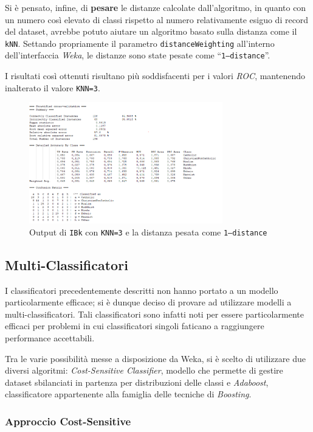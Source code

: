 \documentclass[a4paper,11pt,twoside,notitlepage,final]{scrartcl}
\begin{document}
Si è pensato, infine, di \textbf{pesare} le distanze calcolate dall'algoritmo, in quanto con un numero così elevato di classi rispetto al numero relativamente esiguo di record del dataset, avrebbe potuto aiutare un algoritmo basato sulla distanza come il \texttt{kNN}.
Settando propriamente il parametro \texttt{distanceWeighting} all'interno dell'interfaccia \emph{Weka}, le distanze sono state pesate come ``\texttt{1--distance}''.

I risultati così ottenuti risultano più soddisfacenti per i valori \emph{ROC}, mantenendo inalterato il valore \texttt{KNN=3}.

\begin{figure}[H]
  \centering
  \includegraphics[width=0.75\textwidth]{fig/kNNWeighted.PNG}%
  \caption{Output di \texttt{IBk} con \texttt{KNN=3} e la distanza pesata come \texttt{1--distance}}%
  \label{fig:ibk:9}
\end{figure}

\subsection{Multi-Classificatori}

I classificatori precedentemente descritti non hanno portato a un modello particolarmente efficace;
si è dunque deciso di provare ad utilizzare modelli a multi-classificatori.
Tali classificatori sono infatti noti per essere particolarmente efficaci per problemi in cui classificatori singoli faticano a raggiungere performance accettabili.

Tra le varie possibilità messe a disposizione da Weka, si è scelto di utilizzare due diversi algoritmi:
\emph{Cost-Sensitive Classifier}, modello che permette di gestire dataset sbilanciati in partenza per distribuzioni delle classi e \emph{Adaboost}, classificatore appartenente alla famiglia delle tecniche di \emph{Boosting}.

\subsubsection{Approccio Cost-Sensitive}
\end{document}
